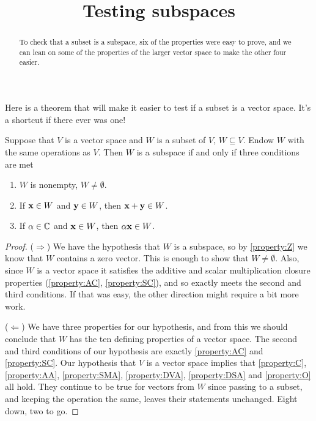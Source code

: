 \documentclass{ximera}
\title{Testing subspaces}
\begin{document}
\begin{abstract}
  To check that a subset is a subspace, six of the properties were
  easy to prove, and we can lean on some of the properties of the
  larger vector space to make the other four easier.
\end{abstract}
\maketitle

Here is a theorem that will make it easier to test if a subset is a vector space.  It's a shortcut if there ever was one!

\begin{theorem}
  \label{theorem:TSS}

  Suppose that $V$ is a vector space and $W$ is a subset of $V$,
  $W\subseteq V$.  Endow $W$ with the same operations as $V$.  Then $W$
  is a subspace if and only if three conditions are met
  \begin{enumerate}
  \item $W$ is nonempty, $W\neq\emptyset$.
  \item If $\mathbf{x}\in W$ and $\mathbf{y}\in W$, then $\mathbf{x}+\mathbf{y}\in W$.
  \item If $\alpha\in\mathbb{C}$ and $\mathbf{x}\in W$, then $\alpha\mathbf{x}\in W$.
  \end{enumerate}
  
  \begin{proof}
    ($\Rightarrow$) We have the hypothesis that $W$ is a subspace, so
    by \ref{property:Z} we know that $W$ contains a zero vector.  This
    is enough to show that $W\neq\emptyset$.  Also, since $W$ is a
    vector space it satisfies the additive and scalar multiplication
    closure properties (\ref{property:AC}, \ref{property:SC}), and so
    exactly meets the second and third conditions.  If that was easy,
    the other direction might require a bit more work.

    ($\Leftarrow$) We have three properties for our hypothesis, and
    from this we should conclude that $W$ has the ten defining
    properties of a vector space.  The second and third conditions of
    our hypothesis are exactly \ref{property:AC} and
    \ref{property:SC}.  Our hypothesis that $V$ is a vector space
    implies that \ref{property:C}, \ref{property:AA},
    \ref{property:SMA}, \ref{property:DVA}, \ref{property:DSA} and
    \ref{property:O} all hold.  They continue to be true for vectors
    from $W$ since passing to a subset, and keeping the operation the
    same, leaves their statements unchanged.  Eight down, two to go.


\end{proof}
\end{theorem}
\end{document}
